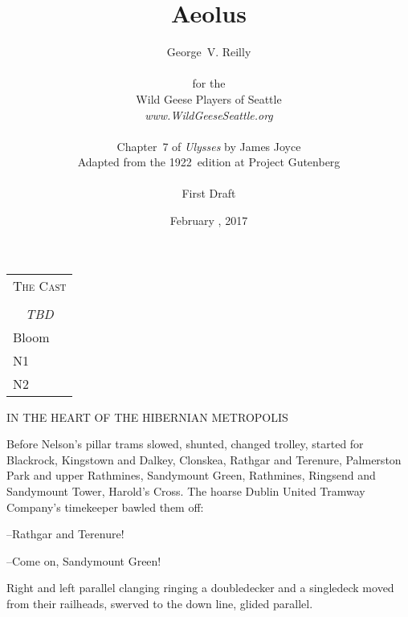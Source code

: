 


\title{\Huge Aeolus}
\author{George~V. Reilly\\
\\
{\small for the}\\
Wild Geese Players of Seattle\\
{\emph{www.WildGeeseSeattle.org}}\\
\\
{\small Chapter~7 of \emph{Ulysses} by James Joyce}\\
{\small Adapted from the 1922~edition at Project Gutenberg}
\\
\\
{\small First Draft}}
\date{February , 2017}
\raggedbottom



\maketitle
\thispagestyle{empty}
\pagebreak

\begin{tabular}{lp{10cm}}
    \multicolumn{2}{c}{\Large \textsc{The Cast}} \\
\\
    \multicolumn{2}{c}{\large \textit{TBD}} \\
Bloom \\
N1 \\
N2 \\
\end{tabular}

\thispagestyle{empty}
\newpage


\setcounter{page}{1}

    IN THE HEART OF THE HIBERNIAN METROPOLIS


Before Nelson's pillar trams slowed, shunted, changed trolley, started
for Blackrock, Kingstown and Dalkey, Clonskea, Rathgar and Terenure,
Palmerston Park and upper Rathmines, Sandymount Green, Rathmines,
Ringsend and Sandymount Tower, Harold's Cross. The hoarse Dublin
United Tramway Company's timekeeper bawled them off:

--Rathgar and Terenure!

--Come on, Sandymount Green!

Right and left parallel clanging ringing a doubledecker and a
singledeck moved from their railheads, swerved to the down line, glided
parallel.

